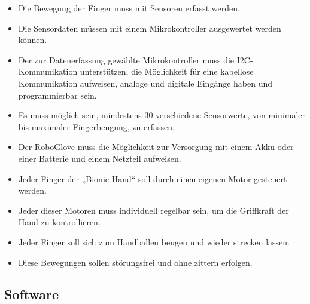 \documentclass[11pt]{article}
\begin{document}
	\begin{itemize}
		\item Die Bewegung der Finger muss mit Sensoren erfasst werden.
		\item Die Sensordaten müssen mit einem Mikrokontroller ausgewertet werden können.
		\item Der zur Datenerfassung gewählte Mikrokontroller muss die I2C-Kommunikation unterstützen, die Möglichkeit
			  für eine kabellose Kommunikation aufweisen, analoge und digitale Eingänge haben und programmierbar sein. 
		\item Es muss möglich sein, mindestens 30 verschiedene Sensorwerte, von minimaler bis maximaler Fingerbeugung, 
		      zu erfassen.
		\item Der RoboGlove muss die Möglichkeit zur Versorgung mit einem Akku oder einer Batterie und einem Netzteil 
		      aufweisen. 
		\item Jeder Finger der „Bionic Hand“ soll durch einen eigenen Motor gesteuert werden.
		\item Jeder dieser Motoren muss individuell regelbar sein, um die Griffkraft der Hand zu kontrollieren.	
		\item Jeder Finger soll sich zum Handballen beugen und wieder strecken lassen.	
		\item Diese Bewegungen sollen störungsfrei und ohne zittern erfolgen.
	\end{itemize}

\subsection{Software}
\end{document}
